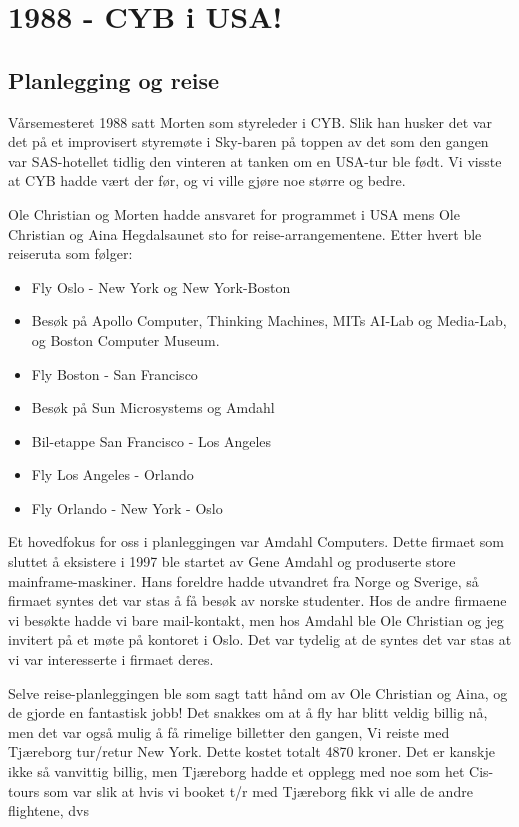 \documentclass[../../main.tex]{subfiles}
\begin{document}
\chapter{1988 - CYB i USA!}

\author{Av Morten Moen \& Ole Christian Lingjærde}


\section{Planlegging og reise}

Vårsemesteret 1988 satt Morten som styreleder i CYB. Slik han husker det var det på et improvisert styremøte i Sky-baren på toppen av det som den gangen var SAS-hotellet tidlig den vinteren at tanken om en USA-tur ble født. Vi visste at CYB hadde vært der før, og vi ville gjøre noe større og bedre.

Ole Christian og Morten hadde ansvaret for programmet i USA mens Ole Christian og Aina Hegdalsaunet sto for reise-arrangementene. Etter hvert ble reiseruta som følger:

\begin{itemize}
	\item Fly Oslo - New York og New York-Boston
	\item Besøk på Apollo Computer, Thinking Machines, MITs AI-Lab og Media-Lab, og Boston Computer Museum. 
	\item Fly Boston - San Francisco 
	\item Besøk på Sun Microsystems og Amdahl
	\item Bil-etappe San Francisco - Los Angeles
	\item Fly Los Angeles - Orlando
	\item Fly Orlando - New York - Oslo
\end{itemize}

Et hovedfokus for oss i planleggingen var Amdahl Computers. Dette firmaet som sluttet å eksistere i 1997 ble startet av Gene Amdahl og produserte store mainframe-maskiner. Hans foreldre hadde utvandret fra Norge og Sverige, så firmaet syntes det var stas å få besøk av norske studenter. Hos de andre firmaene vi besøkte hadde vi bare mail-kontakt, men hos Amdahl ble Ole Christian og jeg invitert på et møte på kontoret i Oslo. Det var tydelig at de syntes det var stas at vi var interesserte i firmaet deres.

Selve reise-planleggingen ble som sagt tatt hånd om av Ole Christian og Aina, og de gjorde en fantastisk jobb! Det snakkes om at å fly har blitt veldig billig nå, men det var også mulig å få rimelige billetter den gangen, Vi reiste med Tjæreborg tur/retur New York. Dette kostet totalt 4870 kroner. Det er kanskje ikke så vanvittig billig, men Tjæreborg hadde et opplegg med noe som het Cis-tours som var slik at hvis vi booket t/r med Tjæreborg fikk vi alle de andre flightene, dvs
\end{document}
